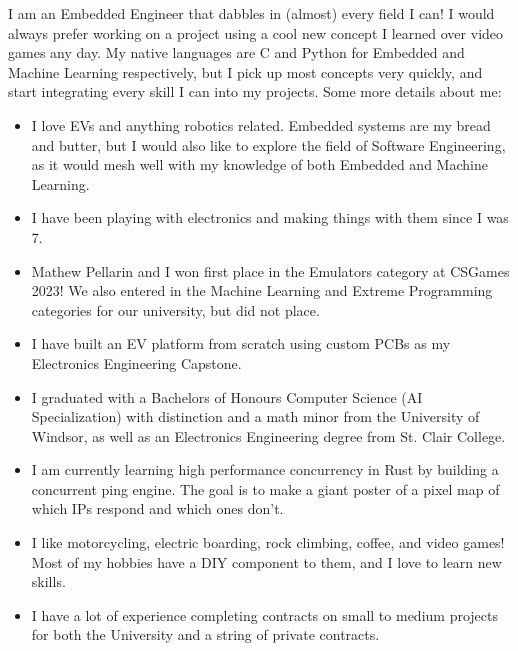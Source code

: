 I am an Embedded Engineer that dabbles in (almost) every field I can! I would always prefer working on a project using a cool new concept I learned over video games any day. My native languages are C and Python for Embedded and Machine Learning respectively, but I pick up most concepts very quickly, and start integrating every skill I can into my projects. Some more details about me:

\begin{itemize}
  \item I love EVs and anything robotics related. Embedded systems are my bread and butter, but I would also like to explore the field of Software Engineering, as it would mesh well with my knowledge of both Embedded and Machine Learning.
  \item I have been playing with electronics and making things with them since I was 7.
  \item Mathew Pellarin and I won first place in the Emulators category at CSGames 2023! We also entered in the Machine Learning and Extreme Programming categories for our university, but did not place.
  \item I have built an EV platform from scratch using custom PCBs as my Electronics Engineering Capstone.
  \item I graduated with a Bachelors of Honours Computer Science (AI Specialization) with distinction and a math minor from the University of Windsor, as well as an Electronics Engineering degree from St. Clair College.
  \item I am currently learning high performance concurrency in Rust by building a concurrent ping engine. The goal is to make a giant poster of a pixel map of which IPs respond and which ones don't.
  \item I like motorcycling, electric boarding, rock climbing, coffee, and video games! Most of my hobbies have a DIY component to them, and I love to learn new skills.
  \item I have a lot of experience completing contracts on small to medium projects for both the University and a string of private contracts.
\end{itemize}
